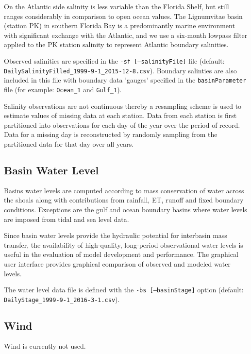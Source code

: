 On the Atlantic side salinity is less variable than the Florida Shelf, but still ranges considerably in comparison to open ocean values.  The Lignumvitae basin (station PK) in southern Florida Bay is a predominantly marine environment with significant exchange with the Atlantic, and we use a six-month lowpass filter applied to the PK station salinity to represent Atlantic boundary salinities.

Observed salinities are specified in the \texttt{-sf [--salinityFile]} file \newline (default: \texttt{DailySalinityFilled\_1999-9-1\_2015-12-8.csv}). Boundary salinties are also included in this file with boundary data 'gauges' specified in the \texttt{basinParameter} file (for example: \texttt{Ocean\_1} and \texttt{Gulf\_1}).

Salinity observations are not continuous thereby a resampling scheme is used to estimate values of missing data at each station.  Data from each station is first partitioned into observations for each day of the year over the period of record.  Data for a missing day is reconstructed by randomly sampling from the partitioned data for that day over all years.

\subsection{Basin Water Level}
\label{sec:Basin Water Level}
Basins water levels are computed according to mass conservation of water across the shoals along with contributions from rainfall, ET, runoff and fixed boundary conditions.  Exceptions are the gulf and ocean boundary basins where water levels are imposed from tidal and sea level data.  

Since basin water levels provide the hydraulic potential for interbasin mass transfer, the availability of high-quality, long-period observational water levels is useful in the evaluation of model development and performance.  The graphical user interface provides graphical comparison of observed and modeled water levels. 

The water level data file is defined with the \texttt{-bs [--basinStage]} option \newline (default: \texttt{DailyStage\_1999-9-1\_2016-3-1.csv}).

\subsection{Wind}
\label{sec:Wind}
Wind is currently not used. 

